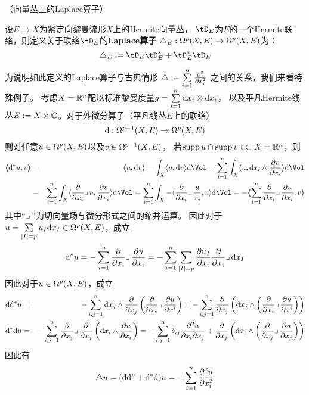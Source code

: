 \begin{definition}（向量丛上的Laplace算子）

设$E\to X$为紧定向黎曼流形$X$上的Hermite向量丛，
$\tD_E$为$E$的一个Hermite联络，则定义关于联络$\tD_E$的\textbf{Laplace算子}
$\triangle_E:\Omega^p(X,E)\to\Omega^p(X,E)$为：
$$\yc_E:=\tD_E\tD_E^*+\tD_E^*\tD_E$$
\end{definition}


为说明如此定义的Laplace算子与古典情形
$\triangle:=\sum\limits_{i=1}^{n}\frac{\partial^2}{\partial x_i^2}$
之间的关系，我们来看特殊例子。
考虑$X=\mathbb{R}^n$配以标准黎曼度量$g=\sum\limits_{i=1}^n\mathrm{d} x_i\otimes\mathrm{d} x_i$，
以及平凡Hermite线丛$E:=X\times\mathbb{C}$。对于外微分算子（平凡线丛$E$上的联络）
$$\mathrm{d}:\Omega^{p-1}(X,E)\to\Omega^p(X,E)$$
则对任意$u\in\Omega^p(X,E)$以及$v\in\Omega^{p-1}(X,E)$，
若$\operatorname{supp} u\cap\operatorname{supp} v\subset\!\subset X=\mathbb{R}^n$，则
\begin{eqnarray*}
     \ppair{\td^*u}{v}
&=&
     \ppair{u}{\td v}
 =
     \int_X\pair{u}{\td v}\td\Vol
 =
     \sum_{i=1}^{n}\int_X
     \pair{u}{\td x_i\wedge\pfrac{v}{x_i}}\td\Vol\\
&=&
     \sum_{i=1}^{n}\int_X
     \pair{\pp{x_i}\suobing u}{\pfrac{v}{x_i}}\td\Vol
 =
     \sum_{i=1}^{n}\int_X
     -\pair{\pp{x_i}\suobing\frac{u}{x_i}}{v}\td\Vol
 =
     -\ppair{\sum_{i=1}^{n}\pp{x_i}\suobing\pfrac{u}{x_i}}
           {v}
\end{eqnarray*}
其中“$\lrcorner\,$”为切向量场与微分形式之间的缩并运算。
因此对于$u=\sum\limits_{|I|=p}u_I\mathrm{d} x_I\in\Omega^p(X,E)$，成立
$$
  \mathrm{d}^* u
=
  -\sum_{i=1}^{n}
  \frac{\partial } {\partial x_i}\lrcorner\,\frac{\partial u} {\partial x_i}
=
  -\sum_{i=1}^{n}
   \sum_{|I|=p}
   \frac{\partial u_I} {\partial x_i}
   \frac{\partial } {\partial x_i}\lrcorner\,\mathrm{d} x_I
$$
因此对于$u\in\Omega^p(X,E)$，成立
\begin{eqnarray*}
     \mathrm{d}\mathrm{d}^*u
&=&
     -\sum_{i,j=1}^{n}
        \mathrm{d} x_j\wedge\frac{\partial } {\partial x_j}
        \left(
          \frac{\partial } {\partial x_i}\lrcorner\,\frac{\partial u} {\partial x^i}
        \right)
 =
     -\sum_{i,j=1}^{n}
        \frac{\partial } {\partial x_j}
        \left(
          \mathrm{d} x_j\wedge
          \left(
          \frac{\partial } {\partial x_i}\lrcorner\,\frac{\partial u} {\partial x^i}
          \right)
        \right)
\\
     \mathrm{d}^*\mathrm{d} u
&=&
     -\sum_{i,j=1}^{n}
        \frac{\partial } {\partial x_j}\lrcorner\,\frac{\partial } {\partial x_j}
        \left(
          \mathrm{d} x_i\wedge\frac{\partial u} {\partial x_i}
        \right)
 =
     -\sum_{i,j=1}^n
        \delta_{ij}\frac{\partial^2{u}} {\partial{x_i}\partial{x_j}}
       +\frac{\partial } {\partial x_j}
        \left(
          \mathrm{d} x_i\wedge
          \left(
            \frac{\partial } {\partial x_j}\lrcorner\,\frac{\partial u} {\partial x_j}
          \right)
        \right)
\end{eqnarray*}
因此有
$$
  \triangle u=(\mathrm{d}\mathrm{d}^*+\mathrm{d}^*\mathrm{d})u
       =-\sum_{i=1}^{n}
         \frac{\partial^2 u}{\partial x_i^2}
$$

